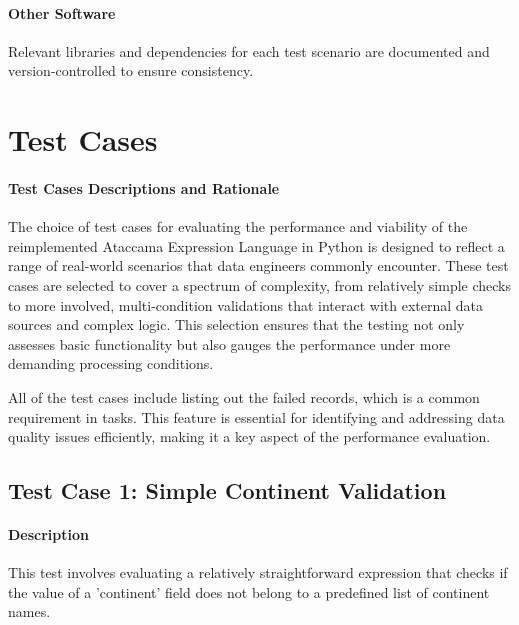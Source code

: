     \paragraph{Other Software} Relevant libraries and dependencies for each test scenario are documented and version-controlled to ensure consistency. 
    

\section{Test Cases}


\paragraph{Test Cases Descriptions and Rationale}

The choice of test cases for evaluating the performance and viability of the reimplemented Ataccama Expression Language in Python is designed to reflect a range of real-world scenarios that data engineers commonly encounter. These test cases are selected to cover a spectrum of complexity, from relatively simple checks to more involved, multi-condition validations that interact with external data sources and complex logic. This selection ensures that the testing not only assesses basic functionality but also gauges the performance under more demanding processing conditions.

All of the test cases include listing out the failed records, which is a common requirement in  tasks. This feature is essential for identifying and addressing data quality issues efficiently, making it a key aspect of the performance evaluation.

\subsection{Test Case 1: Simple Continent Validation}

\paragraph{Description} This test involves evaluating a relatively straightforward expression that checks if the value of a 'continent' field does not belong to a predefined list of continent names. 

